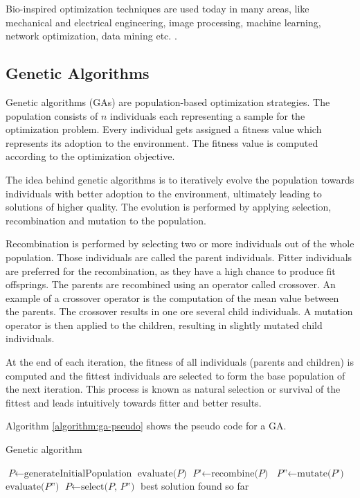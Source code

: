 Bio-inspired optimization techniques are used today in many areas, like mechanical and electrical engineering, image processing, machine learning, network optimization, data mining etc. \cite{sivanandam2008genetic}.

\subsection{Genetic Algorithms}
\label{chap:bioalgorithms:ga}
Genetic algorithms (GAs) are population-based optimization strategies. The population consists of $n$ individuals each representing a sample for the optimization problem. Every individual gets assigned a fitness value which represents its adoption to the environment. The fitness value is computed according to the optimization objective.

The idea behind genetic algorithms is to iteratively evolve the population towards individuals with better adoption to the environment, ultimately leading to solutions of higher quality. The evolution is performed by applying selection, recombination and mutation to the population.

Recombination is performed by selecting two or more individuals out of the whole population. Those individuals are called the parent individuals. Fitter individuals are preferred for the recombination, as they have a high chance to produce fit offsprings. The parents are recombined using an operator called crossover. An example of a crossover operator is the computation of the mean value between the parents. The crossover results in one ore several child individuals. A mutation operator is then applied to the children, resulting in slightly mutated child individuals.


At the end of each iteration, the fitness of all individuals (parents and children) is computed and the fittest individuals are selected to form the base population of the next iteration. This process is known as natural selection or survival of the fittest and leads intuitively towards fitter and better results. 

Algorithm \ref{algorithm:ga-pseudo} shows the pseudo code for a GA.

\begin{algorithm}
  \caption{Genetic algorithm}\label{algorithm:ga-pseudo}
  \begin{algorithmic}[1]
  \State $\textit{P} \gets \text{generateInitialPopulation}$
  \State $\text{evaluate(} \textit{P} \text{)}$
    \State $\textit{P'} \gets \text{recombine(} \textit{P} \text{)}$
    \State $\textit{P''} \gets \text{mutate(} \textit{P'} \text{)}$
    \State $\text{evaluate(} \textit{P''} \text{)}$
    \State $\textit{P} \gets \text{select(} \textit{P, P''} \text{)}$
  \EndWhile
  \Return best solution found so far
  \EndProcedure
  \end{algorithmic}
\end{algorithm}

